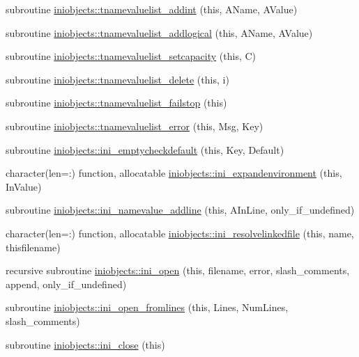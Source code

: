 \begin{DoxyCompactItemize}
\item 
subroutine \mbox{\hyperlink{namespaceiniobjects_a4c60c5afba93a368d2e832c9adbf6964}{iniobjects\+::tnamevaluelist\+\_\+addint}} (this, A\+Name, A\+Value)
\item 
subroutine \mbox{\hyperlink{namespaceiniobjects_a73327dd98a8e02b51bff94237d0cad1d}{iniobjects\+::tnamevaluelist\+\_\+addlogical}} (this, A\+Name, A\+Value)
\item 
subroutine \mbox{\hyperlink{namespaceiniobjects_a42d39e0fcf188dab68646beac2c1fa50}{iniobjects\+::tnamevaluelist\+\_\+setcapacity}} (this, C)
\item 
subroutine \mbox{\hyperlink{namespaceiniobjects_a7846fce943c898567326478e49f7741f}{iniobjects\+::tnamevaluelist\+\_\+delete}} (this, i)
\item 
subroutine \mbox{\hyperlink{namespaceiniobjects_a0e1ea28af24ea8496e138262c1da71f0}{iniobjects\+::tnamevaluelist\+\_\+failstop}} (this)
\item 
subroutine \mbox{\hyperlink{namespaceiniobjects_a24c1905bc9b561d8eeb12877f6a8cca3}{iniobjects\+::tnamevaluelist\+\_\+error}} (this, Msg, Key)
\item 
subroutine \mbox{\hyperlink{namespaceiniobjects_a872a852d7d01ebf31f03d17592e7fd31}{iniobjects\+::ini\+\_\+emptycheckdefault}} (this, Key, Default)
\item 
character(len=\+:) function, allocatable \mbox{\hyperlink{namespaceiniobjects_a3f10c54af4bf829a3e62436354908f1e}{iniobjects\+::ini\+\_\+expandenvironment}} (this, In\+Value)
\item 
subroutine \mbox{\hyperlink{namespaceiniobjects_a7b4567ba50cfd79f25f01c2a2b311e6b}{iniobjects\+::ini\+\_\+namevalue\+\_\+addline}} (this, A\+In\+Line, only\+\_\+if\+\_\+undefined)
\item 
character(len=\+:) function, allocatable \mbox{\hyperlink{namespaceiniobjects_a292876b02309b0dec55346a08b3b2cdd}{iniobjects\+::ini\+\_\+resolvelinkedfile}} (this, name, thisfilename)
\item 
recursive subroutine \mbox{\hyperlink{namespaceiniobjects_a74dae844438b97709e8a7fb1c44d87e9}{iniobjects\+::ini\+\_\+open}} (this, filename, error, slash\+\_\+comments, append, only\+\_\+if\+\_\+undefined)
\item 
subroutine \mbox{\hyperlink{namespaceiniobjects_acc50d404fe26696d6c641fabb4ae033f}{iniobjects\+::ini\+\_\+open\+\_\+fromlines}} (this, Lines, Num\+Lines, slash\+\_\+comments)
\item 
subroutine \mbox{\hyperlink{namespaceiniobjects_a54b6f011847c6047fd2e0dfbe9d9314d}{iniobjects\+::ini\+\_\+close}} (this)

\end{DoxyCompactItemize}
